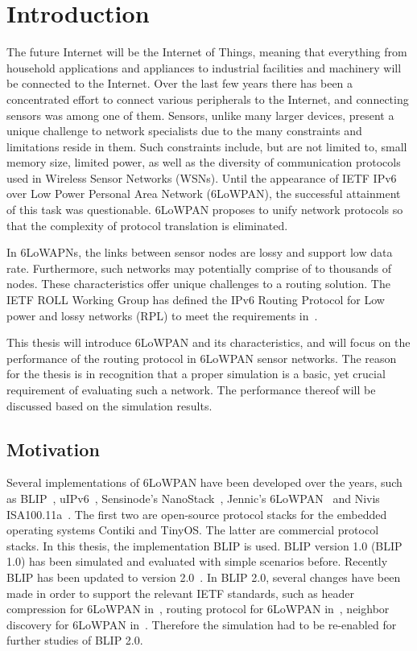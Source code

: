 \chapter{Introduction}
\label{1.0 Intr}

The future Internet will be the Internet of Things, meaning that everything from household applications and appliances to industrial facilities and machinery will be connected to the Internet. Over the last few years there has been a concentrated effort to connect various peripherals to the Internet, and connecting sensors was among one of them. Sensors, unlike many larger devices, present a unique challenge to network specialists due to the many constraints and limitations reside in them. Such constraints include, but are not limited to, small memory size, limited power, as well as the diversity of communication protocols used in Wireless Sensor Networks (WSNs)\@. Until the appearance of IETF IPv6 over Low Power Personal Area Network (6LoWPAN)\@, the successful attainment of this task was questionable. 6LoWPAN proposes to unify network protocols so that the complexity of protocol translation is eliminated. 

In 6LoWAPNs, the links between sensor nodes are lossy and support low data rate. Furthermore, such networks may potentially comprise of to thousands of nodes. These characteristics offer unique challenges to a routing solution. The IETF ROLL Working Group has defined the IPv6 Routing Protocol for Low power and lossy networks (RPL) to meet the requirements in~\cite{draft-ietf-roll-rpl-19}.

This thesis will introduce 6LoWPAN and its characteristics, and will focus on the performance of the routing protocol in 6LoWPAN sensor networks. The reason for the thesis is in recognition that a proper simulation is a basic, yet crucial requirement of evaluating such a network. The performance thereof will be discussed based on the simulation results.

\section{Motivation}
\label{Intr:Motiv}

Several implementations of 6LoWPAN have been developed over the years, such as BLIP~\cite{BLIP}, uIPv6~\cite{uIPv6},  Sensinode's NanoStack~\cite{Sensinode}, Jennic's 6LoWPAN~\cite{Jennic} and Nivis ISA100.11a~\cite{Nivis}. The first two are open-source protocol stacks for the embedded operating systems Contiki and TinyOS. The latter are commercial protocol stacks. In this thesis, the implementation BLIP is used. BLIP version 1.0 (BLIP 1.0) has been simulated and evaluated with simple scenarios before. Recently BLIP has been updated to version 2.0~\cite{BLIP2.0}\@. In BLIP 2.0, several changes have been made in order to support the relevant IETF standards, such as header compression for 6LoWPAN in~\cite{draft-ietf-6lowpan-hc-15}, routing protocol for 6LoWPAN in~\cite{draft-ietf-roll-rpl-19}, neighbor discovery for 6LoWPAN in~\cite{draft-ietf-6lowpan-nd-17}. 
Therefore the simulation had to be re-enabled for further studies of BLIP 2.0. 

